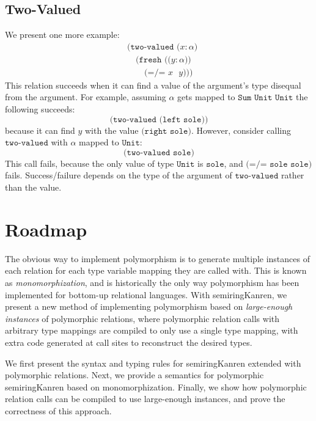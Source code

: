 \documentclass{report}
\theoremstyle{definition}
\begin{document}
\subsection{Two-Valued}

We present one more example:
\begin{equation}
\begin{aligned}
	& \texttt{(two-valued (\(x : \alpha\))} \\
	& \quad \texttt{(fresh ((\(y : \alpha\)))} \\
	& \quad \quad \texttt{(=/= \(x\) \(y\))))}
\end{aligned}
\end{equation}
This relation succeeds when it can find a value of the argument's type disequal from the argument.
For example, assuming \(\alpha\) gets mapped to \(\texttt{Sum Unit Unit}\) the following succeeds:
\begin{equation}
	\texttt{(two-valued (left sole))}
\end{equation}
because it can find \(y\) with the value \(\texttt{(right sole)}\).
However, consider calling \(\texttt{two-valued}\) with \(\alpha\) mapped to \(\texttt{Unit}\):
\begin{equation}
	\texttt{(two-valued sole)}
\end{equation}
This call fails, because the only value of type \(\texttt{Unit}\) is \(\texttt{sole}\), and \(\texttt{(=/= sole sole)}\) fails.
Success/failure depends on the type of the argument of \(\texttt{two-valued}\) rather than the value.

\section{Roadmap}

The obvious way to implement polymorphism is to generate multiple instances of each relation for each type variable mapping they are called with.
This is known as \emph{monomorphization}, and is historically the only way polymorphism has been implemented for bottom-up relational languages.
With semiringKanren, we present a new method of implementing polymorphism based on \emph{large-enough instances} of polymorphic relations,
where polymorphic relation calls with arbitrary type mappings are compiled to only use a single type mapping, with extra code generated at call sites to reconstruct the desired types.

We first present the syntax and typing rules for semiringKanren extended with polymorphic relations.
Next, we provide a semantics for polymorphic semiringKanren based on monomorphization.
Finally, we show how polymorphic relation calls can be compiled to use large-enough instances, and prove the correctness of this approach.
\end{document}
